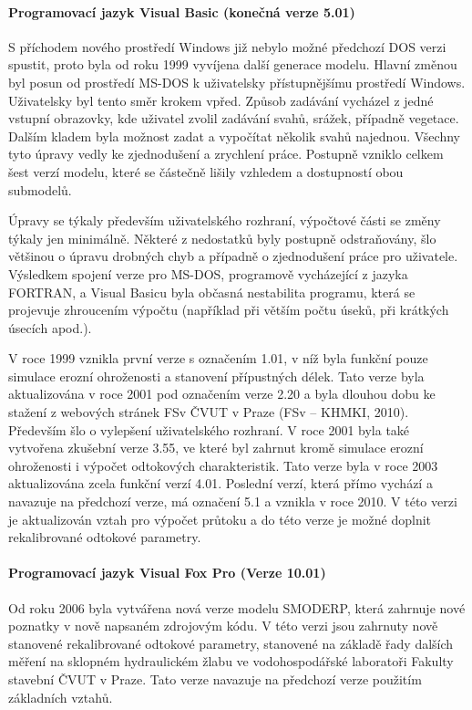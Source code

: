 \paragraph*{Programovací jazyk Visual Basic (konečná verze 5.01)}

S příchodem nového prostředí Windows již nebylo možné předchozí DOS verzi spustit, proto byla od roku 1999 vyvíjena další generace modelu. Hlavní změnou byl posun od prostředí MS-DOS k uživatelsky přístupnějšímu prostředí Windows. Uživatelsky byl tento směr krokem vpřed. Způsob zadávání vycházel z jedné vstupní obrazovky, kde uživatel zvolil zadávání svahů, srážek, případně vegetace. Dalším kladem byla možnost zadat a vypočítat několik svahů najednou. Všechny tyto úpravy vedly ke zjednodušení a zrychlení práce. Postupně vzniklo celkem šest verzí modelu, které se částečně lišily vzhledem a dostupností obou submodelů.

Úpravy se týkaly především uživatelského rozhraní, výpočtové části se změny týkaly jen minimálně. Některé z  nedostatků byly postupně odstraňovány, šlo většinou o úpravu drobných chyb a případně o zjednodušení práce pro uživatele. Výsledkem spojení verze pro MS-DOS, programově vycházející z jazyka FORTRAN, a Visual Basicu byla občasná nestabilita programu, která se projevuje zhroucením výpočtu (například při větším počtu úseků, při krátkých úsecích apod.).

V roce 1999 vznikla první verze s označením 1.01, v  níž byla funkční pouze simulace erozní ohroženosti a stanovení přípustných délek. Tato verze byla aktualizována v roce 2001 pod označením verze 2.20 a byla dlouhou dobu ke stažení z webových stránek FSv ČVUT v Praze (FSv – KHMKI, 2010). Především šlo o vylepšení uživatelského rozhraní. V roce 2001 byla také vytvořena zkušební verze 3.55, ve které byl zahrnut kromě simulace erozní ohroženosti i výpočet odtokových charakteristik. Tato verze byla v roce 2003 aktualizována zcela funkční verzí 4.01. Poslední verzí, která přímo vychází a navazuje na předchozí verze, má označení 5.1 a vznikla v roce 2010. V této verzi je aktualizován vztah pro výpočet průtoku a do této verze je možné doplnit rekalibrované odtokové parametry. 

\paragraph*{Programovací jazyk Visual Fox Pro (Verze 10.01)}

Od roku 2006 byla vytvářena nová verze modelu SMODERP, která zahrnuje nové poznatky v nově napsaném zdrojovým kódu. V této verzi jsou zahrnuty nově stanovené rekalibrované odtokové parametry, stanovené na základě řady dalších měření na sklopném hydraulickém žlabu ve vodohospodářské  laboratoři Fakulty stavební ČVUT v Praze. Tato verze navazuje na předchozí verze použitím základních vztahů.  

